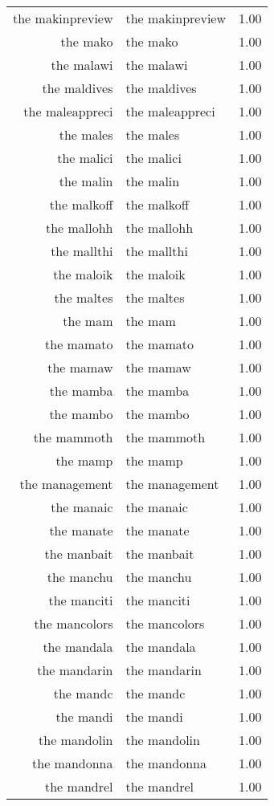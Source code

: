 \begin{table}[ht]
\begin{tabular}{rlr}
  the makinpreview & the makinpreview & 1.00 \\ 
  the mako & the mako & 1.00 \\ 
  the malawi & the malawi & 1.00 \\ 
  the maldives & the maldives & 1.00 \\ 
  the maleappreci & the maleappreci & 1.00 \\ 
  the males & the males & 1.00 \\ 
  the malici & the malici & 1.00 \\ 
  the malin & the malin & 1.00 \\ 
  the malkoff & the malkoff & 1.00 \\ 
  the mallohh & the mallohh & 1.00 \\ 
  the mallthi & the mallthi & 1.00 \\ 
  the maloik & the maloik & 1.00 \\ 
  the maltes & the maltes & 1.00 \\ 
  the mam & the mam & 1.00 \\ 
  the mamato & the mamato & 1.00 \\ 
  the mamaw & the mamaw & 1.00 \\ 
  the mamba & the mamba & 1.00 \\ 
  the mambo & the mambo & 1.00 \\ 
  the mammoth & the mammoth & 1.00 \\ 
  the mamp & the mamp & 1.00 \\ 
  the management & the management & 1.00 \\ 
  the manaic & the manaic & 1.00 \\ 
  the manate & the manate & 1.00 \\ 
  the manbait & the manbait & 1.00 \\ 
  the manchu & the manchu & 1.00 \\ 
  the manciti & the manciti & 1.00 \\ 
  the mancolors & the mancolors & 1.00 \\ 
  the mandala & the mandala & 1.00 \\ 
  the mandarin & the mandarin & 1.00 \\ 
  the mandc & the mandc & 1.00 \\ 
  the mandi & the mandi & 1.00 \\ 
  the mandolin & the mandolin & 1.00 \\ 
  the mandonna & the mandonna & 1.00 \\ 
  the mandrel & the mandrel & 1.00 \\ 

\end{tabular}
\end{table}

